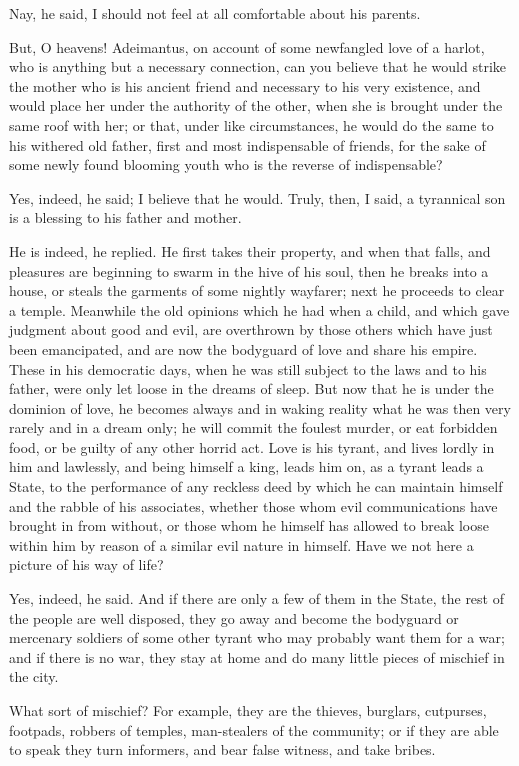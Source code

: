 Nay, he said, I should not feel at all comfortable about his parents.

But, O heavens! Adeimantus, on account of some newfangled love of a harlot, who is anything but a necessary connection, can you believe that he would strike the mother who is his ancient friend and necessary to his very existence, and would place her under the authority of the other, when she is brought under the same roof with her; or that, under like circumstances, he would do the same to his withered old father, first and most indispensable of friends, for the sake of some newly found blooming youth who is the reverse of indispensable?

Yes, indeed, he said; I believe that he would.
Truly, then, I said, a tyrannical son is a blessing to his father and mother.

He is indeed, he replied.
He first takes their property, and when that falls, and pleasures are beginning to swarm in the hive of his soul, then he breaks into a house, or steals the garments of some nightly wayfarer; next he proceeds to clear a temple. Meanwhile the old opinions which he had when a child, and which gave judgment about good and evil, are overthrown by those others which have just been emancipated, and are now the bodyguard of love and share his empire. These in his democratic days, when he was still subject to the laws and to his father, were only let loose in the dreams of sleep. But now that he is under the dominion of love, he becomes always and in waking reality what he was then very rarely and in a dream only; he will commit the foulest murder, or eat forbidden food, or be guilty of any other horrid act. Love is his tyrant, and lives lordly in him and lawlessly, and being himself a king, leads him on, as a tyrant leads a State, to the performance of any reckless deed by which he can maintain himself and the rabble of his associates, whether those whom evil communications have brought in from without, or those whom he himself has allowed to break loose within him by reason of a similar evil nature in himself. Have we not here a picture of his way of life?

Yes, indeed, he said.
And if there are only a few of them in the State, the rest of the people are well disposed, they go away and become the bodyguard or mercenary soldiers of some other tyrant who may probably want them for a war; and if there is no war, they stay at home and do many little pieces of mischief in the city.

What sort of mischief?
For example, they are the thieves, burglars, cutpurses, footpads, robbers of temples, man-stealers of the community; or if they are able to speak they turn informers, and bear false witness, and take bribes.

